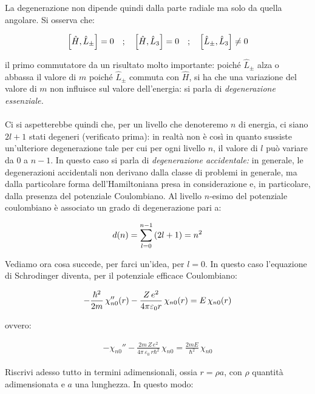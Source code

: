 	La degenerazione non dipende quindi dalla parte radiale ma solo da quella angolare. Si osserva che:

\begin{align*}
	\qty[\hat{H}, \hat{L}_{\pm}] = 0 \quad ; \quad \qty[\hat{H}, \hat{L}_{3}] = 0 \quad ; \quad \qty[\hat{L}_{\pm}, \hat{L}_{3}] \neq 0 
\end{align*}

	il primo commutatore da un risultato molto importante: poiché $\hat{L}_{\pm}$ alza o abbassa il valore di $m$ poiché $\hat{L}_{\pm}$ commuta con $\hat{H}$, si ha che una variazione del valore di $m$ non influisce sul valore dell'energia: si parla di \textit{degenerazione essenziale.}
	\\
	\\
	Ci si aspetterebbe quindi che, per un livello che denoteremo $n$ di energia, ci siano $2l + 1$ stati degeneri (verificato prima): in realtà non è così in quanto sussiste un'ulteriore degenerazione tale per cui per ogni livello $n$, il valore di $l$ può variare da $0$ a $n - 1$. In questo caso si parla di \textit{degenerazione accidentale:} in generale, le degenerazioni accidentali non derivano dalla classe di problemi in generale, ma dalla particolare forma dell'Hamiltoniana presa in considerazione e, in particolare, dalla presenza del potenziale Coulombiano. Al livello $n$-esimo del potenziale coulombiano è associato un grado di degenerazione pari a:

\begin{align*}
	d\qty(n) = \sum_{ l = 0}^{n -1} \qty(2l  +1) = n^2
\end{align*}

	Vediamo ora cosa succede, per farci un'idea, per $l = 0$. In questo caso l'equazione di Schrodinger diventa, per il potenziale efficace Coulombiano:

\begin{nb}
\begin{align*}
	-\frac{\hbar^2}{2m} \, \chi_{n0}''\qty(r) - \frac{Z \, e^2}{4\pi \varepsilon_0 r} \, \chi_{n0}\qty(r) = E \, \chi_{n0}\qty(r)
\end{align*}
\end{nb}

	ovvero:
	
\begin{align*}
	- \chi_{n0}'' - \frac{2m \, Z \, e^2}{4\pi \, \varepsilon_0 \, r \hbar^2} \, \chi_{n0} = \frac{2mE}{\hbar^2} \, \chi_{n0}
\end{align*}

	Riscrivi adesso tutto in termini adimensionali, ossia $r = \rho a$, con $\rho$ quantità adimensionata e $a$ una lunghezza. In questo modo:
	

